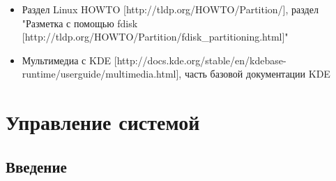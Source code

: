 \documentclass[10pt]{book}
\begin{document}
\phantom{}
\begin{tcolorbox}[title=\textbf{Дальнейшие ресурсы}, colback=yellow!14!white, colframe=red!75!blue]
\begin{itemize}
\item Раздел Linux HOWTO [http://tldp.org/HOWTO/Partition/], раздел "Разметка с помощью fdisk [http://tldp.org/HOWTO/Partition/fdisk\_partitioning.html]"
\item Мультимедиа с KDE [http://docs.kde.org/stable/en/kdebase-runtime/userguide/multimedia.html], часть базовой документации KDE
\end{itemize}
\end{tcolorbox}

\newpage


\chapter{Управление системой}

\section{Введение}
\end{document}
